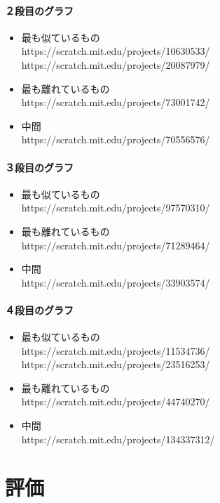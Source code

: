 \documentclass[a4paper,10pt,onecolumn,oneside,openany]{jsbook}
\begin{document}
\subsubsection{２段目のグラフ}
 \begin{itemize}
\item 最も似ているもの
\\https://scratch.mit.edu/projects/10630533/
\\https://scratch.mit.edu/projects/20087979/
\item 最も離れているもの
\\https://scratch.mit.edu/projects/73001742/
\item 中間
\\https://scratch.mit.edu/projects/70556576/
\end{itemize}

\subsubsection{３段目のグラフ}
\begin{itemize}
\item 最も似ているもの
\\https://scratch.mit.edu/projects/97570310/
\item 最も離れているもの
\\https://scratch.mit.edu/projects/71289464/
\item 中間
\\https://scratch.mit.edu/projects/33903574/
\end{itemize}
 
 \subsubsection{４段目のグラフ}
 \begin{itemize}
\item 最も似ているもの
\\https://scratch.mit.edu/projects/11534736/
\\https://scratch.mit.edu/projects/23516253/
\item 最も離れているもの
\\https://scratch.mit.edu/projects/44740270/
\item 中間
\\https://scratch.mit.edu/projects/134337312/
\end{itemize}



\chapter{評価}
\end{document}
